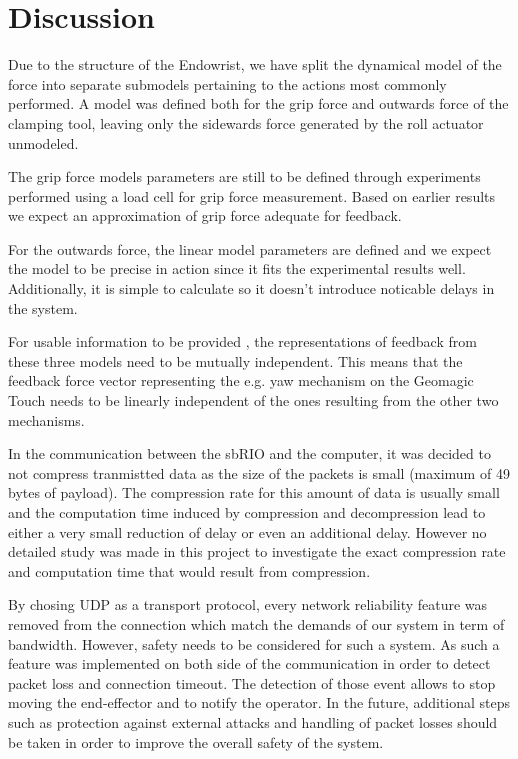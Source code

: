 \section{Discussion}
Due to the structure of the Endowrist, we have split the dynamical model of the force into separate submodels pertaining to the actions most commonly performed.
A model was defined both for the grip force and outwards force of the clamping tool, leaving only the sidewards force generated by the roll actuator unmodeled.

The grip force models parameters are still to be defined through experiments performed using a load cell for grip force measurement.
Based on earlier results \cite{kim2014dynamic} we expect an approximation of grip force adequate for feedback.

For the outwards force, the linear model parameters are defined and we expect the model to be precise in action since it fits the experimental results well.
Additionally, it is simple to calculate so it doesn't introduce noticable delays in the system.

For usable information to be provided , the representations of feedback from these three models need to be mutually independent.
This means that the feedback force vector representing the e.g. yaw mechanism on the Geomagic Touch needs to be linearly independent of the ones resulting from the other two mechanisms.


In the communication between the sbRIO and the computer, it was decided to not compress tranmistted data as the size of the packets is small (maximum of 49 bytes of payload). The compression rate for this amount of data is usually small and the computation time induced by compression and decompression lead to either a very small reduction of delay or even an additional delay. However no detailed study was made in this project to investigate the exact compression rate and computation time that would result from compression.

By chosing UDP as a transport protocol, every network reliability feature was removed from the connection which match the demands of our system in term of bandwidth. However, safety needs to be considered for such a system. As such a feature was implemented on both side of the communication in order to detect packet loss and connection timeout. The detection of those event allows to stop moving the end-effector and to notify the operator. In the future, additional steps such as protection against external attacks and handling of packet losses should be taken in order to improve the overall safety of the system.

